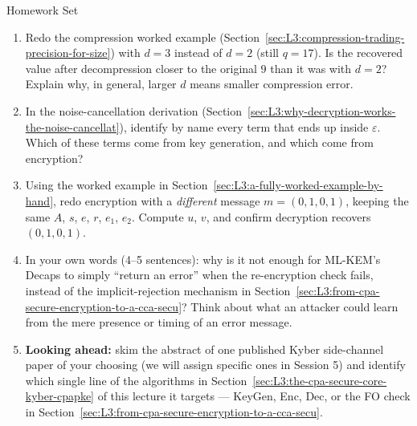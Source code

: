 \begin{exercisebox}{Homework Set}
\begin{enumerate}[leftmargin=*]
  \item Redo the compression worked example (Section~\ref{sec:L3:compression-trading-precision-for-size}) with $d=3$ instead of $d=2$ (still $q=17$). Is the recovered value after decompression closer to the original $9$ than it was with $d=2$? Explain why, in general, larger $d$ means smaller compression error.
  \item In the noise-cancellation derivation (Section~\ref{sec:L3:why-decryption-works-the-noise-cancellat}), identify by name every term that ends up inside $\varepsilon$. Which of these terms come from key generation, and which come from encryption?
  \item Using the worked example in Section~\ref{sec:L3:a-fully-worked-example-by-hand}, redo encryption with a \emph{different} message $m=(0,1,0,1)$, keeping the same $A$, $s$, $e$, $r$, $e_1$, $e_2$. Compute $u$, $v$, and confirm decryption recovers $(0,1,0,1)$.
  \item In your own words (4--5 sentences): why is it not enough for ML-KEM's Decaps to simply ``return an error'' when the re-encryption check fails, instead of the implicit-rejection mechanism in Section~\ref{sec:L3:from-cpa-secure-encryption-to-a-cca-secu}? Think about what an attacker could learn from the mere presence or timing of an error message.
  \item \textbf{Looking ahead:} skim the abstract of one published Kyber side-channel paper of your choosing (we will assign specific ones in Session 5) and identify which single line of the algorithms in Section~\ref{sec:L3:the-cpa-secure-core-kyber-cpapke} of this lecture it targets --- KeyGen, Enc, Dec, or the FO check in Section~\ref{sec:L3:from-cpa-secure-encryption-to-a-cca-secu}.
\end{enumerate}
\end{exercisebox}
